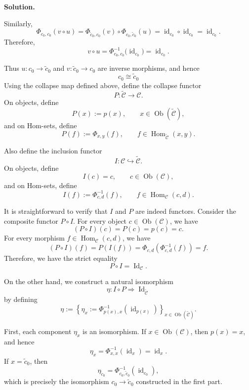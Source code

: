 \documentclass[11pt,a4paper]{article}
\newcounter{problem}
\newcounter{saveequation}
\newenvironment{solution}
{
	\par
	\setcounter{saveequation}{\value{equation}}
	\begingroup
	\setcounter{equation}{0}
	\renewcommand{\theequation}{\arabic{problem}.\arabic{equation}}
	\renewcommand{\theHequation}{sol.\arabic{problem}.\arabic{equation}}
	\noindent\textbf{Solution.}\quad
}
{
	\par
	\endgroup
	\setcounter{equation}{\value{saveequation}}
}
\begin{document}
\begin{solution}
		Similarly,
		\[
		\Phi_{c_0,c_0}(v\circ u)
		=
		\Phi_{\widetilde c_0,c_0}(v)
		\circ
		\Phi_{c_0,\widetilde c_0}(u)
		=
		\operatorname{id}_{c_0}\circ\operatorname{id}_{c_0}
		=
		\operatorname{id}_{c_0}.
		\]
		Therefore,
		\[
		v\circ u
		=
		\Phi_{c_0,c_0}^{-1}
		\bigl(\operatorname{id}_{c_0}\bigr)
		=
		\operatorname{id}_{c_0}.
		\]
		
		Thus \(u:c_0\to\widetilde c_0\) and
		\(v:\widetilde c_0\to c_0\) are inverse morphisms, and hence
		\[
		\boxed{
		c_0\cong\widetilde c_0}
		\]
		Using the collapse map defined above, define the collapse functor
		\[
		P:\widetilde{\mathcal C}\longrightarrow\mathcal C.
		\]
		On objects, define
		\[
		P(x):=p(x),
		\qquad
		x\in\operatorname{Ob}(\widetilde{\mathcal C}),
		\]
		and on Hom-sets, define
		\[
		P(f):=\Phi_{x,y}(f),
		\qquad
		f\in\operatorname{Hom}_{\widetilde{\mathcal C}}(x,y).
		\]
		
		Also define the inclusion functor
		\[
		I:\mathcal C\hookrightarrow\widetilde{\mathcal C}.
		\]
		On objects, define
		\[
		I(c)=c,
		\qquad
		c\in\operatorname{Ob}(\mathcal C),
		\]
		and on Hom-sets, define
		\[
		I(f):=\Phi_{c,d}^{-1}(f),
		\qquad
		f\in\operatorname{Hom}_{\mathcal C}(c,d).
		\]
		
		It is straightforward to verify that \(I\) and \(P\) are indeed functors.
		Consider the composite functor \(P\circ I\). For every object
		\(c\in\operatorname{Ob}(\mathcal C)\), we have
		\[
		(P\circ I)(c)=P(c)=p(c)=c.
		\]
		For every morphism
		\(f\in\operatorname{Hom}_{\mathcal C}(c,d)\), we have
		\[
		(P\circ I)(f)
		=
		P(I(f))
		=
		\Phi_{c,d}
		\left(
		\Phi_{c,d}^{-1}(f)
		\right)
		=
		f.
		\]
		Therefore, we have the strict equality
		\[
		P\circ I=\operatorname{Id}_{\mathcal C}.
		\]
		
		On the other hand, we construct a natural isomorphism
		\[
		\eta:I\circ P\Longrightarrow
		\operatorname{Id}_{\widetilde{\mathcal C}}
		\]
		by defining
		\[
		\eta
		:=
		\left\{
		\eta_x
		:=
		\Phi_{p(x),x}^{-1}
		\left(
		\operatorname{id}_{p(x)}
		\right)
		\right\}_{x\in\operatorname{Ob}(\widetilde{\mathcal C})}.
		\]
		
		First, each component \(\eta_x\) is an isomorphism. If
		\(x\in\operatorname{Ob}(\mathcal C)\), then \(p(x)=x\), and hence
		\[
		\eta_x
		=
		\Phi_{x,x}^{-1}
		\left(
		\operatorname{id}_x
		\right)
		=
		\operatorname{id}_x.
		\]
		If \(x=\widetilde c_0\), then
		\[
		\eta_{\widetilde c_0}
		=
		\Phi_{c_0,\widetilde c_0}^{-1}
		\left(
		\operatorname{id}_{c_0}
		\right),
		\]
		which is precisely the isomorphism
		\(c_0\to\widetilde c_0\) constructed in the first part.
		

\end{solution}
\end{document}
